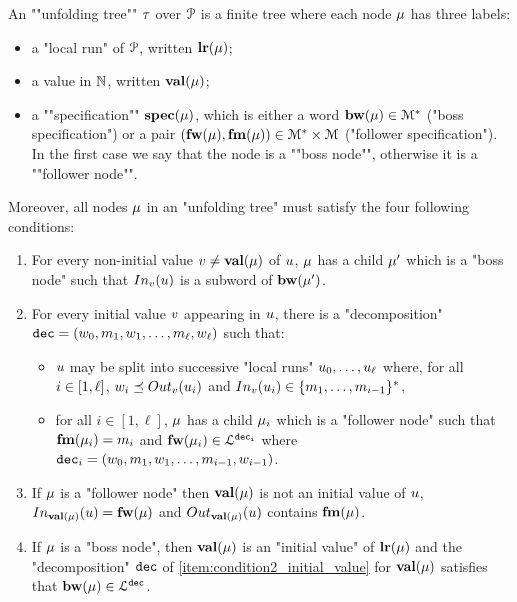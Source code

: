 \AP An ""unfolding tree"" $\tau$ over $\mathcal{P}$ is
a finite tree where each node $\mu$ has three labels:
\begin{itemize}
	\item a "local run" of $\mathcal{P}$, written $\mathbf{lr}(\mu)$;
	
	\item a value in $\mathbb{N}$, written $\mathbf{val}(\mu)$;
	
	\item a ""specification"" $\mathbf{spec}(\mu)$, which is either a word $\mathbf{bw}(\mu) \in \mathcal{M}^*$ ("boss specification") or a pair $(\mathbf{fw}(\mu), \mathbf{fm}(\mu)) \in \mathcal{M}^* \times \mathcal{M}$ ("follower specification"). In the first case we say that the node is a ""boss node"", otherwise it is a ""follower node"".
\end{itemize} 
Moreover, all nodes $\mu$ in an "unfolding tree" must satisfy the four following conditions:
\begin{enumerate}[label= (\roman*), ref=(\roman*)]
	\item \label{item:condition1_non_initial_value} For every non-initial value $v \ne \mathbf{val}(\mu)$ of $u$, $\mu$ has a child $\mu'$ which is a "boss node" such that $\vinput{\aval}{\localrun}$ is a subword of $\mathbf{bw}(\mu')$.
	
	\item \label{item:condition2_initial_value} For every initial value $v$ appearing in $u$, there is a "decomposition" $\mathtt{dec} = (w_0, m_1, w_1, \ldots, m_{\ell}, w_{\ell})$ such that:
	\begin{itemize}
		\item $u$ may be split into successive "local runs" $u_0, \dots, u_{\ell}$ where, for all $i \in [1,\ell]$, $w_i \subword \voutput{\aval}{\localrun_i}$ and $\vinput{\aval}{\localrun_i} \in \set{m_1, \dots, m_{i-1}}^*$,
		\item for all $i \in [1,\ell]$, $\mu$ has a child $\mu_i$ which is a "follower node" such that $\mathbf{fm}(\mu_i) = m_i$ and $\mathbf{fw}(\mu_i) \in\mathcal{L}^{\mathtt{\mathtt{dec}_i}}$ where $\mathtt{dec}_i = (w_0, m_1, w_1, \ldots, m_{i-1}, w_{i-1})$.	\end{itemize}
	
	\item \label{item:condition3_follower_node} If $\mu$ is a "follower node" then $\mathbf{val}(\mu)$ is not an initial value of $u$, $\vinput{\valuelabel{\node}}{\localrun} = \followlabelword{\node}$ and 
	$\voutput{\valuelabel{\node}}{\localrun}$ contains $\mathbf{fm}(\mu)$.

	\item \label{item:condition4_boss_node} If $\mu$ is a "boss node", then $\mathbf{val}(\mu)$ is an "initial value" of $\mathbf{lr}(\mu)$ and the "decomposition" $\mathtt{dec}$ of \ref{item:condition2_initial_value} for $\mathbf{val}(\mu)$ satisfies that $\mathbf{bw}(\mu) \in \mathcal{L}^{\mathtt{\mathtt{dec}}}$.
\end{enumerate}

